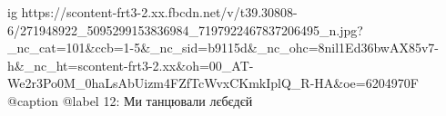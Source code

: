  
 
 
 
 

\ifcmt
  ig https://scontent-frt3-2.xx.fbcdn.net/v/t39.30808-6/271948922_5095299153836984_7197922467837206495_n.jpg?_nc_cat=101&ccb=1-5&_nc_sid=b9115d&_nc_ohc=8nil1Ed36bwAX85v7-h&_nc_ht=scontent-frt3-2.xx&oh=00_AT-We2r3Po0M_0haLsAbUizm4FZfTcWvxCKmkIplQ_R-HA&oe=6204970F
  @caption @label 12: Ми танцювали лєбєдєй
\fi
